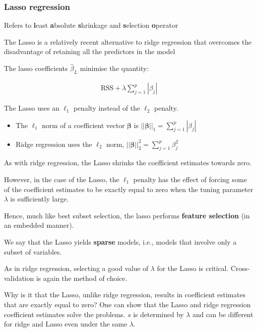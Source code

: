\subsubsection{Lasso regression}

\indent

Refers to \textbf{l}east \textbf{a}bsolute \textbf{s}hrinkage and \textbf{s}election \textbf{o}perator

The Lasso is a relatively recent alternative to ridge regression that overcomes the disadvantage of retaining all the predictors in the model 

The lasso coefficients $\widehat{\beta}_L$  minimise the quantity:

\begin{align*}
    \text{RSS} + \lambda\sum_{j=1}^p |\beta_j|
\end{align*}

The Lasso uses an $\ell_1$ penalty instead of the $\ell_2$ penalty.

\begin{itemize}
    \item The $\ell_1$ norm of a coefficient vector $\boldsymbol{\beta}$ is $||\boldsymbol{\beta}||_1 = \sum_{j=1}^p |\beta_j|$
    \item Ridge regression uses the $\ell_2$ norm, $||\boldsymbol{\beta}||_2^2 = \sum_{j=1}^p \beta_j^2$
\end{itemize}

As with ridge regression, the Lasso shrinks the coefficient estimates towards zero.

However, in the case of the Lasso, the $\ell_1$ penalty has the effect of forcing some of the coefficient estimates to be exactly equal to zero when the tuning parameter $\lambda$ is sufficiently large.

Hence, much like best subset selection, the lasso performs \textbf{feature selection} (in an embedded manner).

We say that the Lasso yields \textbf{sparse} models, i.e., models that involve only a subset of variables.

As in ridge regression, selecting a good value of $\lambda$ for the Lasso is critical. Cross-validation is again the method of choice.

\bigskip

Why is it that the Lasso, unlike ridge regression, results in coefficient estimates that are exactly equal to zero? One can show that the Lasso and ridge regression coefficient estimates solve the problems. $s$ is determined by $\lambda$ and can be different for ridge and Lasso even under the same $\lambda$.

